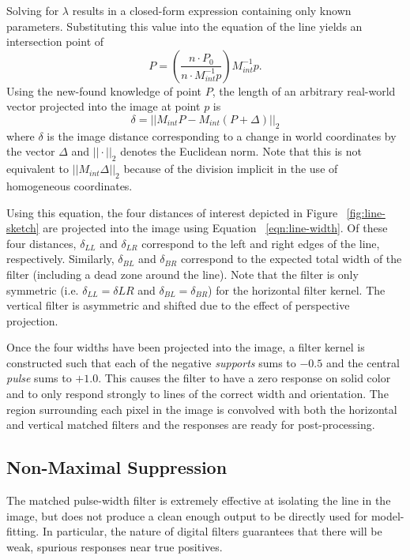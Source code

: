 \documentclass[twocolumn,11pt]{article}
\begin{document}
Solving for $\lambda$ results in a closed-form expression containing
only known parameters. Substituting this value into the equation of the
line yields an intersection point of
\begin{equation*}
 	P = \left(\frac{n \cdot P_0}{n \cdot M^{-1}_{int} p}\right) M^{-1}_{int} p.
	\label{eqn:line-point}
\end{equation*}
Using the new-found knowledge of point $P$, the length of an arbitrary real-world
vector projected into the image at point $p$ is
\begin{equation}
	\delta = ||M_{int} P - M_{int} (P + \Delta)||_2
	\label{eqn:line-width}
\end{equation}
where $\delta$ is the image distance corresponding to a change in world
coordinates by the vector $\Delta$ and $||\cdot||_2$ denotes the Euclidean
norm. Note that this is not equivalent to $||M_{int}\Delta||_2$ because of the
division implicit in the use of homogeneous coordinates.

Using this equation, the four distances of interest depicted in Figure
~\ref{fig:line-sketch} are projected into the image using Equation
~\ref{eqn:line-width}. Of these four distances, $\delta_{LL}$ and $\delta_{LR}$
correspond to the left and right edges of the line, respectively. Similarly,
$\delta_{BL}$ and $\delta_{BR}$ correspond to the expected total width of the
filter (including a dead zone around the line). Note that the filter is only
symmetric (i.e. $\delta_{LL} = \delta{LR}$ and $\delta_{BL} = \delta_{BR}$) for
the horizontal filter kernel. The vertical filter is asymmetric and shifted due
to the effect of perspective projection.

Once the four widths have been projected into the image, a filter kernel is
constructed such that each of the negative \textit{supports} sums to $-0.5$
and the central \textit{pulse} sums to $+1.0$. This causes the filter to have
a zero response on solid color and to only respond strongly to lines of the
correct width and orientation. The region surrounding each pixel in the image
is convolved with both the horizontal and vertical matched filters and the
responses are ready for post-processing.

\subsection{Non-Maximal Suppression}
\label{sec:line-max}
The matched pulse-width filter is extremely effective at isolating the line in
the image, but does not produce a clean enough output to be directly used for
model-fitting. In particular, the nature of digital filters guarantees that
there will be weak, spurious responses near true positives.
\end{document}
